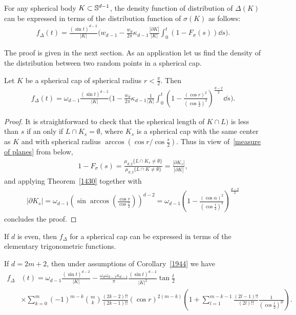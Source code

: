 \documentclass[12pt, reqno]{amsart}
\begin{document}
\begin{theorem}\label{1430}
For any spherical body $K\subset\mathbb{S}^{d-1}$, the density function of distribution of $\Delta(K)$ can be expressed in terms of the distribution function of $\sigma(K)$ as follows:
\begin{align*}
     f_\Delta(t)=\frac{(\sin t)^{d-2}}{|K|}\bigg(w_{d-1}-\frac{w_d}{2\pi}\kappa_{d-1}\frac{|\partial K|}{|K|}\int_0^t(1-F_\sigma(s))\dd s\bigg).
\end{align*}
\end{theorem}
The proof is given in the next section.
As an application let us find the density of the distribution between two random points in a spherical cap.
\begin{corollary}\label{1944}
    Let $K$ be a spherical cap of spherical radius $r<\frac{\pi}{2}$. Then
\begin{align*}
     f_\Delta(t)=\omega_{d-1}\frac{(\sin t)^{d-2}}{|K|}\bigg(1-\frac{w_d}{2\pi}\kappa_{d-1}\frac{1}{|K|}\int_0^t \left(1 - \frac{(\cos r) ^2}{(\cos \frac{s}{2}) ^2}\right)^{\frac{d-2}{2}} \dd s\bigg).
\end{align*}
\end{corollary}
\begin{proof}
It is straightforward to check that the spherical length of $K \cap L)$ is less than $s$  if an only if $L \cap K_s = \emptyset$, where $K_s$ is a spherical cap with the same center as $K$ and with spherical radius $\arccos\left({\cos r}/{\cos \frac{s}{2}}\right)$. 
Thus in view of~\eqref{measure of planes} from below, 
\begin{align*}
   1- F_{\sigma}(s)= \frac{\mu_{d,2}\{L \cap K_s \neq \emptyset\}}{\mu_{d,2}\{L \cap K \neq \emptyset\}}=\frac{|\partial K_s|}{|\partial K|},
\end{align*}
and applying Theorem~\ref{1430} together with
\begin{align*}
    {|\partial K_s|}={\omega_{d-1}} \left(\sin\arccos\left(\frac{\cos r}{\cos \frac{s}{2}}\right)\right)^{d-2} = \omega_{d-1}\left(1 - \frac{(\cos \alpha) ^2}{(\cos \frac{t}{2}) ^2}\right)^{\frac{d-2}{2}}
\end{align*}
concludes the proof.
\end{proof}
If $d$ is even, then $f_\Delta$ for a spherical cap can be expressed in terms of the  elementary trigonometric functions.
\begin{corollary}
    If $d=2m+2$, then under assumptions of Corollary~\ref{1944} we have
\begin{align*}
     f_\Delta&(t)=\omega_{d-1}\frac{(\sin t)^{d-2}}{|K|}-\frac{\omega_d\omega_{d-1}\kappa_{d-1}}{\pi}\frac{(\sin t)^{d-2}}{|K|^2}\tan \frac{t}{2}
     \\
     &\times\sum_{k = 0}^{m}(-1)^{m-k}\binom{m}{k}\frac{(2k - 2)!!}{(2k - 1)!!}(\cos r)^{2(m-k)}\left(1 + \sum_{l = 1}^{m - k - 1}\frac{(2l - 1)!!}{(2l)!!}\frac{1}{\left(\cos\frac{t}{2}\right)^{2l}}\right).
\end{align*}
\end{corollary}
\end{document}
